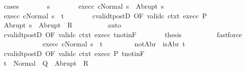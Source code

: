 \begin{isabellebody}
\ {\isacharparenleft}cases{\isacharparenright}\isanewline
\ \ \ \ \ \ \isamarkupfalse%
\ s{\isacharprime}\isanewline
\ \ \ \ \ \ \isamarkupfalse%
\ exec{\isacharunderscore}c{}{\isacharcolon}\ {\isachardoublequoteopen}{\isasymGamma}{\isasymturnstile}{\isasymlangle}cNormal\ s{\isasymrangle}\ {\isasymRightarrow}\ Abrupt\ s{\isacharprime}{\isachardoublequoteclose}\ \isanewline
\ \ \ \ \ \ \isamarkupfalse%
\ exec{\isacharunderscore}c{}{\isacharcolon}\ {\isachardoublequoteopen}{\isasymGamma}{\isasymturnstile}{\isasymlangle}cNormal\ s{\isacharprime}{\isasymrangle}\ {\isasymRightarrow}\ t{\isachardoublequoteclose}\isanewline
\ \ \ \ \ \ \isamarkupfalse%
\ cvalidt{\isacharunderscore}postD\ {\isacharbrackleft}OF\ valid{\isacharunderscore}c{}\ ctxt\ exec{\isacharunderscore}c{}\ P{\isacharbrackright}\isanewline
\ \ \ \ \ \ \isamarkupfalse%
\ {\isachardoublequoteopen}Abrupt\ s{\isacharprime}\ {\isasymin}\ Abrupt\ {\isacharbackquote}\ R{\isachardoublequoteclose}\isanewline
\ \ \ \ \ \ \ \ \isamarkupfalse%
\ auto\isanewline
\ \ \ \ \ \ \isamarkupfalse%
\ cvalidt{\isacharunderscore}postD\ {\isacharbrackleft}OF\ valid{\isacharunderscore}c{}\ ctxt{\isacharbrackright}\ exec{\isacharunderscore}c{}\ t{\isacharunderscore}notin{\isacharunderscore}F\isanewline
\ \ \ \ \ \ \isamarkupfalse%
\ {\isacharquery}thesis\isanewline
\ \ \ \ \ \ \ \ \isamarkupfalse%
\ fastforce\isanewline
\ \ \ \ \isamarkupfalse%
\isanewline
\ \ \ \ \ \ \isamarkupfalse%
\ exec{\isacharunderscore}c{}{\isacharcolon}\ {\isachardoublequoteopen}{\isasymGamma}{\isasymturnstile}{\isasymlangle}cNormal\ s{\isasymrangle}\ {\isasymRightarrow}\ t{\isachardoublequoteclose}\ \isanewline
\ \ \ \ \ \ \isamarkupfalse%
\ notAbr{\isacharcolon}\ {\isachardoublequoteopen}{\isasymnot}\ isAbr\ t{\isachardoublequoteclose}\isanewline
\ \ \ \ \ \ \isamarkupfalse%
\ cvalidt{\isacharunderscore}postD\ {\isacharbrackleft}OF\ valid{\isacharunderscore}c{}\ ctxt\ exec{\isacharunderscore}c{}\ P{\isacharbrackright}\ t{\isacharunderscore}notin{\isacharunderscore}F\isanewline
\ \ \ \ \ \ \isamarkupfalse%
\ {\isachardoublequoteopen}t\ {\isasymin}\ Normal\ {\isacharbackquote}\ Q\ {\isasymunion}\ Abrupt\ {\isacharbackquote}\ R{\isachardoublequoteclose}\ \isacommand{{\isachardot}}\isamarkupfalse%

\end{isabellebody}
